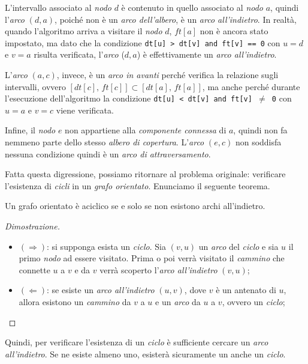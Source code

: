 L'intervallo associato al \emph{nodo} $d$ è contenuto in quello associato
al \emph{nodo} $a$, quindi l'\emph{arco} $(d,a)$, poiché non è un \emph{arco
dell'albero}, è un \emph{arco all'indietro}. In realtà, quando l'algoritmo
arriva a visitare il \emph{nodo} $d$, $ft[a]$ non è ancora stato impostato, ma
dato che la condizione \texttt{dt[u] > dt[v] and ft[v] == 0} con $u=d$ e $v=a$
risulta verificata, l'\emph{arco} ($d,a$) è effettivamente un \emph{arco
all'indietro}.

\noindent
L'\emph{arco} $(a,c)$, invece, è un \emph{arco in avanti} perché verifica la
relazione sugli intervalli, ovvero $[dt[c],\,ft[c]]\subset[dt[a],\,ft[a]]$, ma
anche perché durante l'esecuzione dell'algoritmo la condizione \texttt{dt[u] <
dt[v] and ft[v] $\neq$ 0} con $u=a$ e $v=c$ viene verificata.

Infine, il \emph{nodo} $e$ non appartiene alla \emph{componente connessa} di
$a$, quindi non fa nemmeno parte dello stesso \emph{albero di copertura}.
L'\emph{arco} $(e,c)$ non soddisfa nessuna condizione quindi è un \emph{arco di
attraversamento}.

\bigskip\noindent
Fatta questa digressione, possiamo ritornare al problema originale:
verificare l'esistenza di \emph{cicli} in un \emph{grafo orientato}.
Enunciamo il seguente teorema.
\begin{definition}
    Un grafo orientato è aciclico se e solo se non esistono archi all'indietro.
\end{definition}
\begin{proof}[Dimostrazione]
    \mbox{}
    \begin{itemize}
        \item $(\Rightarrow)$: si supponga esista un \emph{ciclo}. Sia $(v,u)$ un
        \emph{arco} del \emph{ciclo} e sia $u$ il primo \emph{nodo} ad essere visitato.
        Prima o poi verrà visitato il \emph{cammino} che connette $u$ a $v$ e da $v$
        verrà scoperto l'\emph{arco all'indietro} $(v,u)$;
        \item $(\Leftarrow)$: se esiste un \emph{arco all'indietro} $(u,v)$, dove
        $v$ è un antenato di $u$, allora esistono un \emph{cammino} da $v$ a $u$
        e un \emph{arco} da $u$ a $v$, ovvero un \emph{ciclo};
    \end{itemize}
\end{proof}\noindent
Quindi, per verificare l'esistenza di un \emph{ciclo} è sufficiente cercare un
\emph{arco all'indietro}. Se ne esiste almeno uno, esisterà sicuramente un anche
un \emph{ciclo}.

